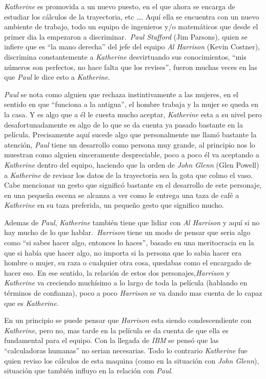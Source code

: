 \documentclass[letterpaper, 12pt]{report}
\begin{document}
\textit{Katherine} es promovida a un nuevo puesto, en el que ahora se encarga
de estudiar los cálculos de la trayectoria, etc \dots \@. Aquí ella se
encuentra con un nuevo ambiente de trabajo, todo un equipo de
ingenieros y/o matemáticos que desde el primer dia la empezaron a
discriminar.~\textit{Paul Stafford} (Jim Parsons), quien se infiere
que es ``la mano derecha'' del jefe del equipo \textit{Al Harrison}
(Kevin Costner), discrimina constantemente a \textit{Katherine} desvirtuando
sus conocimientos, ``mis números son perfectos, no hace falta que los revises'',
fueron muchas veces en las que \textit{Paul} le dice esto a \textit{Katherine}.

\textit{Paul} se nota como alguien que rechaza instintivamente a las mujeres,
en el sentido en que ``funciona a la antigua'', el hombre trabaja y la mujer
se queda en la casa. Y es algo que a él le cuesta mucho aceptar,
\textit{Katherine} esta a su nivel pero desafortunadamente es algo de lo que
se da cuenta ya pasado bastante en la película. Precisamente aquí sucede
algo que personalmente me llamó bastante la atención, \textit{Paul} tiene
un desarrollo como persona muy grande, al principio nos lo muestran como
alguien sinceramente despreciable, poco a poco él va aceptando a
\textit{Katherine} dentro del equipo, haciendo que la orden de
\textit{John Glenn} (Glen Powell) a \textit{Katherine} de revisar los datos
de la trayectoria sea la gota que colmo el vaso. Cabe mencionar un gesto que
significó bastante en el desarrollo de este personaje, en una pequeña
escena se alcanza a ver como le entrega una taza de café a \textit{Katherine}
en su taza preferida, un pequeño gesto que significo mucho.

Ademas de \textit{Paul}, \textit{Katherine} también tiene
que lidiar con \textit{Al Harrison} y aquí si no hay mucho
de lo que hablar.~\textit{Harrison} tiene un modo de pensar
que seria algo como ``si sabes hacer algo, entonces lo
haces'', basado en una meritocracia en la que si había que
hacer algo, no importa si la persona que lo sabia hacer era
hombre o mujer, su raza o cualquier otra cosa, quedabas
como el encargado de hacer eso. En ese sentido, la relación
de estos dos personajes,\textit{Harrison} y
\textit{Katherine} va creciendo muchísimo a lo largo de
toda la película (hablando en términos de confianza), poco
a poco \textit{Harrison} se va dando mas cuenta de lo capaz
que es \textit{Katherine}.

En un principio se puede pensar que \textit{Harrison} esta
siendo condescendiente con \textit{Katherine}, pero no, mas
tarde en la película se da cuenta de que ella es
fundamental para el equipo. Con la llegada de \textit{IBM}
se pensó que las ``calculadoras humanas'' no serian
necesarias. Todo lo contrario \textit{Katherine} fue quien
reviso los cálculos de esta maquina (como en la situación
con \textit{John Glenn}), situación que también influyo en
la relación con \textit{Paul}.
\end{document}
